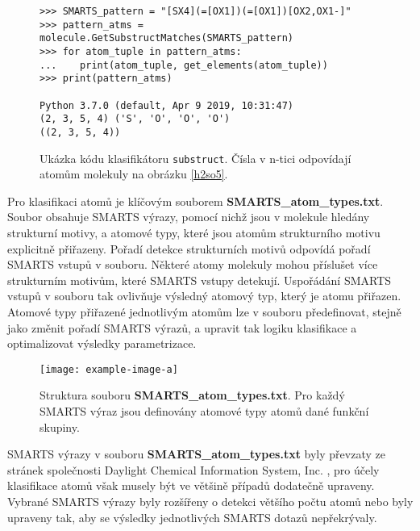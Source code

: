 

\begin{figure}
\begin{lstlisting}
>>> SMARTS_pattern = "[SX4](=[OX1])(=[OX1])[OX2,OX1-]"
>>> pattern_atms = molecule.GetSubstructMatches(SMARTS_pattern)
>>> for atom_tuple in pattern_atms:
...    print(atom_tuple, get_elements(atom_tuple))
>>> print(pattern_atms)

Python 3.7.0 (default, Apr 9 2019, 10:31:47)
(2, 3, 5, 4) ('S', 'O', 'O', 'O')
((2, 3, 5, 4))
\end{lstlisting}
\caption{Ukázka kódu klasifikátoru \texttt{substruct}. Čísla v n-tici odpovídají atomům molekuly na obrázku \ref{h2so5}.}
\end{figure}

\bigskip
Pro klasifikaci atomů je klíčovým souborem \textbf{SMARTS\_atom\_types.txt}. Soubor obsahuje SMARTS výrazy, pomocí nichž jsou v molekule hledány strukturní motivy, a atomové typy, které jsou atomům strukturního motivu explicitně přiřazeny.
Pořadí detekce strukturních motivů odpovídá pořadí SMARTS vstupů v souboru. Některé atomy molekuly mohou příslušet více strukturním motivům, které SMARTS vstupy detekují. Uspořádání SMARTS vstupů v souboru tak ovlivňuje výsledný atomový typ, který je atomu přiřazen. Atomové typy přiřazené jednotlivým atomům lze v souboru předefinovat, stejně jako změnit pořadí SMARTS výrazů, a upravit tak logiku klasifikace a optimalizovat výsledky parametrizace.
\begin{figure}[h]
    \centering
    \texttt{[image: example-image-a]}
    \caption{Struktura souboru \textbf{SMARTS\_atom\_types.txt}. Pro každý SMARTS výraz jsou definovány atomové typy atomů dané funkční skupiny.}
    \label{SMARTS_file}
\end{figure}

SMARTS výrazy v souboru \textbf{SMARTS\_atom\_types.txt} byly převzaty ze stránek společnosti Daylight Chemical Information System, Inc. \cite{SMARTS_exm}, pro účely klasifikace atomů však musely být ve většině případů dodatečně upraveny. Vybrané SMARTS výrazy byly rozšířeny o detekci většího počtu atomů nebo byly upraveny tak, aby %
se výsledky jednotlivých SMARTS dotazů nepřekrývaly. 

